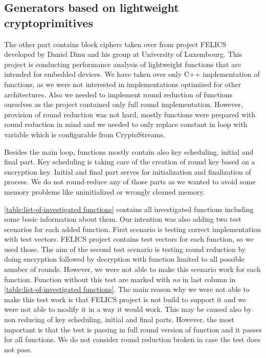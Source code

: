 \documentclass[
    digital,    %
    oneside,    %
    color,
    11pt,
    nocover,
    notable,
    nolof,
    nolot,
    final
]{fithesis3}
\begin{document}
\subsection{Generators based on lightweight cryptoprimitives}
\label{sec:added_lightweight_crypto}

The other part contains block ciphers taken over from project FELICS~\cite{dinu2015felics} developed by Daniel Dinu and his group at University of Luxembourg. This project is conducting performance analysis of lightweight functions that are intended for embedded devices. We have taken over only C++ implementation of functions, as we were not interested in implementations optimized for other architectures. Also we needed to implement round reduction of functions ourselves as the project contained only full round implementation. However, provision of round reduction was not hard, mostly functions were prepared with round reduction in mind and we needed to only replace constant in loop with variable which is configurable from CryptoStreams. 

Besides the main loop, functions mostly contain also key scheduling, initial and final part. Key scheduling is taking care of the creation of round key based on a encryption key. Initial and final part serves for initialization and finalization of process. We do not round-reduce any of those parts as we wanted to avoid some memory problems like uninitialized or wrongly cleaned memory.

\cref{table:list-of-investigated functions} contains all investigated functions including some basic information about them. Our intention was also adding two test scenarios for each added function. First scenario is testing correct implementation with test vectors. FELICS project contains test vectors for each function, so we used those. The aim of the second test scenario is testing round reduction by doing encryption followed by decryption with function limited to all possible number of rounds. However, we were not able to make this scenario work for each function. Function without this test are marked with \textit{no} in last column in \cref{table:list-of-investigated functions}. The main reason why we were not able to make this test work is that FELICS project is not build to support it and we were not able to modify it in a way it would work. This may be caused also by non reducing of key scheduling, initial and final parts. However, the most important is that the test is passing in full round version of function and it passes for all functions. We do not consider round reduction broken in case the test does not pass.
\end{document}

